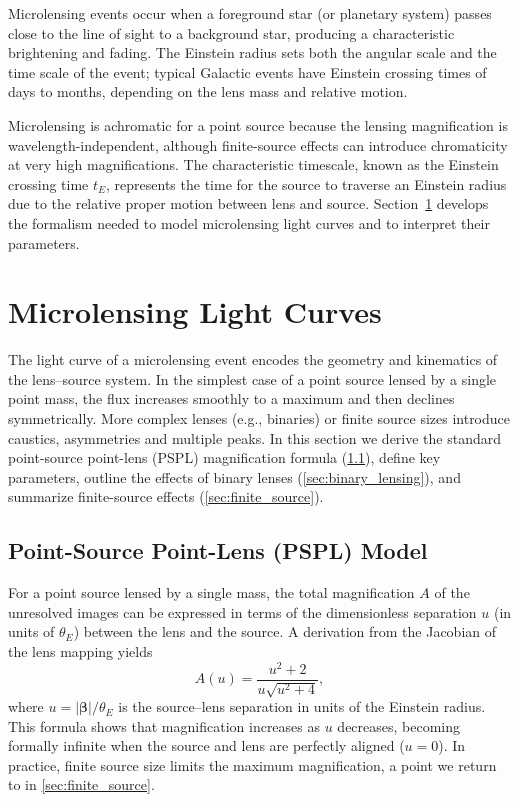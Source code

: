 Microlensing events occur when a foreground star (or planetary system) passes close to the line of sight to a background star, producing a characteristic brightening and fading. The Einstein radius sets both the angular scale and the time scale of the event; typical Galactic events have Einstein crossing times of days to months, depending on the lens mass and relative motion.

Microlensing is achromatic for a point source because the lensing magnification is wavelength-independent, although finite-source effects can introduce chromaticity at very high magnifications. The characteristic timescale, known as the Einstein crossing time $t_E$, represents the time for the source to traverse an Einstein radius due to the relative proper motion between lens and source. Section~\ref{sec:light_curves} develops the formalism needed to model microlensing light curves and to interpret their parameters.

\section{Microlensing Light Curves}
\label{sec:light_curves}

The light curve of a microlensing event encodes the geometry and kinematics of the lens–source system. In the simplest case of a point source lensed by a single point mass, the flux increases smoothly to a maximum and then declines symmetrically. More complex lenses (e.g., binaries) or finite source sizes introduce caustics, asymmetries and multiple peaks. In this section we derive the standard point-source point-lens (PSPL) magnification formula (\cref{sec:pspl}), define key parameters, outline the effects of binary lenses (\cref{sec:binary_lensing}), and summarize finite-source effects (\cref{sec:finite_source}).

\subsection{Point-Source Point-Lens (PSPL) Model}
\label{sec:pspl}

For a point source lensed by a single mass, the total magnification $A$ of the unresolved images can be expressed in terms of the dimensionless separation $u$ (in units of $\theta_E$) between the lens and the source. A derivation from the Jacobian of the lens mapping yields
\begin{equation}
  A(u) = \frac{u^2 + 2}{u \sqrt{u^2 + 4}},
  \label{eq:pspl_mag}
\end{equation}
where $u = |\boldsymbol{\beta}|/\theta_E$ is the source–lens separation in units of the Einstein radius. This formula shows that magnification increases as $u$ decreases, becoming formally infinite when the source and lens are perfectly aligned ($u=0$). In practice, finite source size limits the maximum magnification, a point we return to in \cref{sec:finite_source}.

